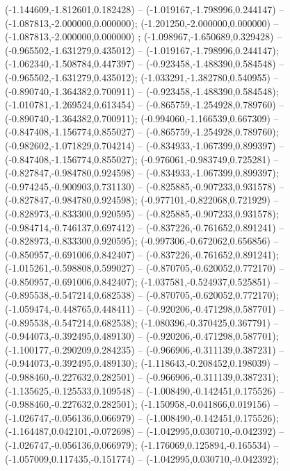  (-1.144609,-1.812601,0.182428) -- (-1.019167,-1.798996,0.244147) -- (-1.087813,-2.000000,0.000000);
 (-1.201250,-2.000000,0.000000) -- (-1.087813,-2.000000,0.000000) ;
 (-1.098967,-1.650689,0.329428) -- (-0.965502,-1.631279,0.435012) -- (-1.019167,-1.798996,0.244147);
 (-1.062340,-1.508784,0.447397) -- (-0.923458,-1.488390,0.584548) -- (-0.965502,-1.631279,0.435012);
 (-1.033291,-1.382780,0.540955) -- (-0.890740,-1.364382,0.700911) -- (-0.923458,-1.488390,0.584548);
 (-1.010781,-1.269524,0.613454) -- (-0.865759,-1.254928,0.789760) -- (-0.890740,-1.364382,0.700911);
 (-0.994060,-1.166539,0.667309) -- (-0.847408,-1.156774,0.855027) -- (-0.865759,-1.254928,0.789760);
 (-0.982602,-1.071829,0.704214) -- (-0.834933,-1.067399,0.899397) -- (-0.847408,-1.156774,0.855027);
 (-0.976061,-0.983749,0.725281) -- (-0.827847,-0.984780,0.924598) -- (-0.834933,-1.067399,0.899397);
 (-0.974245,-0.900903,0.731130) -- (-0.825885,-0.907233,0.931578) -- (-0.827847,-0.984780,0.924598);
 (-0.977101,-0.822068,0.721929) -- (-0.828973,-0.833300,0.920595) -- (-0.825885,-0.907233,0.931578);
 (-0.984714,-0.746137,0.697412) -- (-0.837226,-0.761652,0.891241) -- (-0.828973,-0.833300,0.920595);
 (-0.997306,-0.672062,0.656856) -- (-0.850957,-0.691006,0.842407) -- (-0.837226,-0.761652,0.891241);
 (-1.015261,-0.598808,0.599027) -- (-0.870705,-0.620052,0.772170) -- (-0.850957,-0.691006,0.842407);
 (-1.037581,-0.524937,0.525851) -- (-0.895538,-0.547214,0.682538) -- (-0.870705,-0.620052,0.772170);
 (-1.059474,-0.448765,0.448411) -- (-0.920206,-0.471298,0.587701) -- (-0.895538,-0.547214,0.682538);
 (-1.080396,-0.370425,0.367791) -- (-0.944073,-0.392495,0.489130) -- (-0.920206,-0.471298,0.587701);
 (-1.100177,-0.290209,0.284235) -- (-0.966906,-0.311139,0.387231) -- (-0.944073,-0.392495,0.489130);
 (-1.118643,-0.208452,0.198039) -- (-0.988460,-0.227632,0.282501) -- (-0.966906,-0.311139,0.387231);
 (-1.135625,-0.125533,0.109548) -- (-1.008490,-0.142451,0.175526) -- (-0.988460,-0.227632,0.282501);
 (-1.150958,-0.041866,0.019156) -- (-1.026747,-0.056136,0.066979) -- (-1.008490,-0.142451,0.175526);
 (-1.164487,0.042101,-0.072698) -- (-1.042995,0.030710,-0.042392) -- (-1.026747,-0.056136,0.066979);
 (-1.176069,0.125894,-0.165534) -- (-1.057009,0.117435,-0.151774) -- (-1.042995,0.030710,-0.042392);
